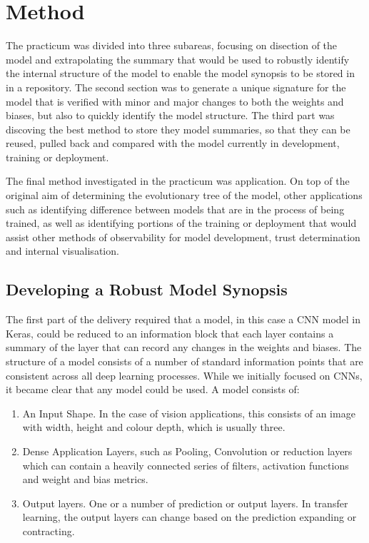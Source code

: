 \section{Method}
The practicum was divided into three subareas, focusing on disection of the model and extrapolating the summary that would be used to robustly identify the internal structure of the model to enable the model synopsis to be stored in in a repository. The second section was to generate a unique signature for the model that is verified with minor and major changes to both the weights and biases, but also to quickly identify the model structure. The third part was discoving the best method to store they model summaries, so that they can be reused, pulled back and compared with the model currently in development, training or deployment.

The final method investigated in the practicum was application. On top of the original aim of determining the evolutionary tree of the model, other applications such as identifying difference between models that are in the process of being trained, as well as identifying portions of the training or deployment that would assist other methods of observability for model development, trust determination and internal visualisation.

\subsection{Developing a Robust Model Synopsis}
The first part of the delivery required that a model, in this case a CNN model in Keras, could be reduced to an information block that each layer contains a summary of the layer that can record any changes in the weights and biases. The structure of a model consists of a number of standard information points that are consistent across all deep learning processes. While we initially focused on CNNs, it became clear that any model could be used. A model consists of:

\begin{enumerate}
\item An Input Shape. In the case of vision applications, this consists of an image with width, height and colour depth, which is usually three.
\item Dense Application Layers, such as Pooling, Convolution or reduction layers which can contain a heavily connected series of filters, activation functions and weight and bias metrics.
\item Output layers. One or a number of prediction or output layers. In transfer learning, the output layers can change based on the prediction expanding or contracting.
\end{enumerate}

